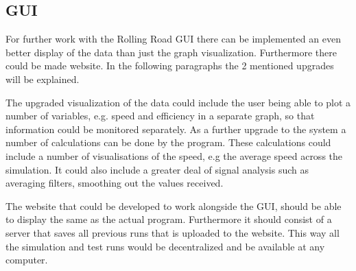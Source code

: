 \subsection*{GUI}
For further work with the Rolling Road GUI there can be implemented an even better display of the data than just the graph visualization. Furthermore there could be made website. In the following paragraphs the 2 mentioned upgrades will be explained. 

The upgraded visualization of the data could include the user being able to plot a number of variables, e.g. speed and efficiency in a separate graph, so that information could be monitored separately. As a further upgrade to the system a number of calculations can be done by the program. These calculations could include a number of visualisations of the speed, e.g the average speed across the simulation. It could also include a greater deal of signal analysis such as averaging filters, smoothing out the values received. 

The website that could be developed to work alongside the GUI, should be able to display the same as the actual program. Furthermore it should consist of a server that saves all previous runs that is uploaded to the website. This way all the simulation and test runs would be decentralized and be available at any computer.  